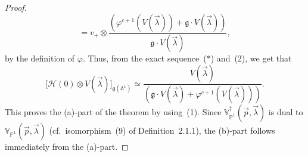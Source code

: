 \documentclass[12pt]{article}
\begin{document}
\begin{proof}
\[        =
        v_+\otimes
        \frac{(\varphi^{c+1}(V(\vec{\lambda}))+\mathfrak g\cdot V(\vec{\lambda}))}
        {\mathfrak g\cdot V(\vec{\lambda})},
    \]
    by the definition of $\varphi$.
    Thus, from the exact sequence~($*$) and~(2), we get that
    \[
        \bigl[\mathcal{H}(0)\otimes V(\vec{\lambda})\bigr]_{\mathfrak g(\mathbb{A}^1)}
        \simeq
        \frac{V(\vec{\lambda})}{(\mathfrak g\cdot V(\vec{\lambda})+\varphi^{c+1}(V(\vec{\lambda})))}.
    \]
    This proves the (a)-part of the theorem by using~(1).
    Since $\mathbb{V}_{\mathbb{P}^1}^\dagger(\vec{p},\vec{\lambda})$ is dual to
    $\mathbb{V}_{\mathbb{P}^1}(\vec{p},\vec{\lambda})$
    (cf.~isomorphism~(9) of Definition~2.1.1),
    the (b)-part follows immediately from the (a)-part.
\end{proof}
\end{document}
